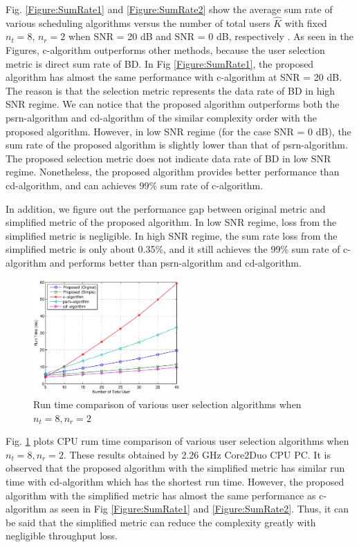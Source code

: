 \documentclass[journal,twoside]{IEEEtranTCOM}
\begin{document}
Fig. \ref{Figure:SumRate1} and \ref{Figure:SumRate2} show the average sum rate of various scheduling algorithms versus the number of total users $\hat{K}$ with fixed $n_t=8$, $n_r=2$ when SNR = 20 dB and SNR = 0 dB, respectively \cite{SRN}. As seen in the Figures, c-algorithm outperforms other methods, because the user selection metric is direct sum rate of BD. In Fig \ref{Figure:SumRate1}, the proposed algorithm has almost the same performance with c-algorithm at SNR = 20 dB. The reason is that the selection metric represents the data rate of BD in high SNR regime. We can notice that the proposed algorithm outperforms both the psrn-algorithm and cd-algorithm of the similar complexity order with the proposed algorithm. However, in low SNR regime (for the case SNR = 0 dB), the sum rate of the proposed algorithm is slightly lower than that of psrn-algorithm. The proposed selection metric does not indicate data rate of BD in low SNR regime. Nonetheless, the proposed algorithm provides better performance than cd-algorithm, and can achieves 99$\%$ sum rate of c-algorithm.

In addition, we figure out the performance gap between original metric and simplified metric of the proposed algorithm. In low SNR regime, loss from the simplified metric is negligible. In high SNR regime, the sum rate loss from the simplified metric is only about 0.35\%, and it still achieves the 99\% sum rate of c-algorithm and performs better than psrn-algorithm and cd-algorithm.

\begin{figure}[!tb]
    \centering
    \includegraphics[width=0.50\textwidth]{RunTime.eps}
\caption{Run time comparison of various user selection algorithms when $n_t=8, n_r=2$}  \label{Figure:RunTime}
\end{figure}

Fig. \ref{Figure:RunTime} plots CPU rum time comparison of various user selection algorithms when $n_t=8, n_r=2$. These results obtained by 2.26 GHz Core2Duo CPU PC. It is observed that the proposed algorithm with the simplified metric has similar run time with cd-algorithm which has the shortest run time. However, the proposed algorithm with the simplified metric has almost the same performance as c-algorithm as seen in Fig \ref{Figure:SumRate1} and \ref{Figure:SumRate2}. Thus, it can be said that the simplified metric can reduce the complexity greatly with negligible throughput loss.
\end{document}
